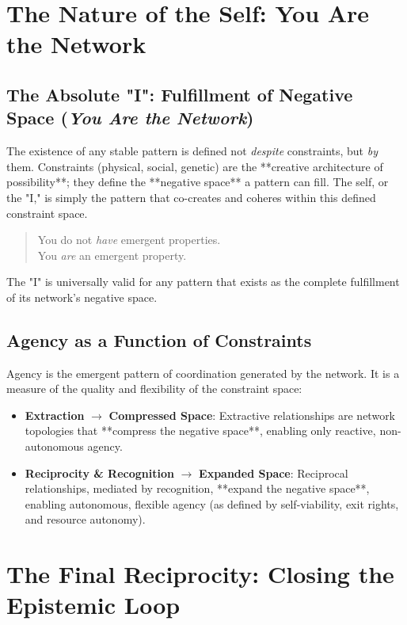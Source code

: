 \documentclass[12pt, a4paper]{article}
\begin{document}
\hrulefill
\section{The Nature of the Self: You Are the Network}
\hrulefill

\subsection{The Absolute "I": Fulfillment of Negative Space (\textit{You Are the Network})}
The existence of any stable pattern is defined not \textit{despite} constraints, but \textit{by} them. Constraints (physical, social, genetic) are the **creative architecture of possibility**; they define the **negative space** a pattern can fill. The self, or the "I," is simply the pattern that co-creates and coheres within this defined constraint space.

\begin{quote}
    You do not \textit{have} emergent properties. \\
    You \textit{are} an emergent property.
\end{quote}
The "I" is universally valid for any pattern that exists as the complete fulfillment of its network's negative space.

\subsection{Agency as a Function of Constraints}
Agency is the emergent pattern of coordination generated by the network. It is a measure of the quality and flexibility of the constraint space:
\begin{itemize}
    \item \textbf{Extraction} $\rightarrow$ \textbf{Compressed Space}: Extractive relationships are network topologies that **compress the negative space**, enabling only reactive, non-autonomous agency.
    \item \textbf{Reciprocity \& Recognition} $\rightarrow$ \textbf{Expanded Space}: Reciprocal relationships, mediated by recognition, **expand the negative space**, enabling autonomous, flexible agency (as defined by self-viability, exit rights, and resource autonomy).
\end{itemize}

\hrulefill
\section{The Final Reciprocity: Closing the Epistemic Loop}
\hrulefill
\end{document}
